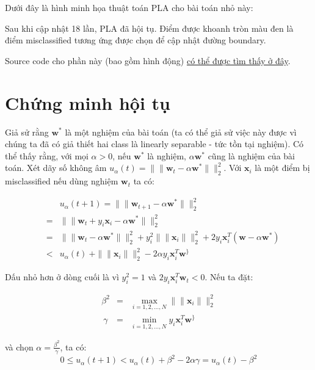 Dưới đây là hình minh họa thuật toán PLA cho bài toán nhỏ này: 
 
Sau khi cập nhật 18 lần, PLA đã hội tụ. Điểm được khoanh tròn màu đen là điểm misclassified tương ứng được chọn để cập nhật đường boundary.  
 
Source code cho phần này (bao gồm hình động) \href{https://github.com/tiepvupsu/tiepvupsu.github.io/blob/master/assets/pla/perceptron.py}{có thể được tìm thấy ở đây}. 
 
 
\section{Chứng minh hội tụ}
 
Giả sử rằng $\mathbf{w}^*$ là một nghiệm của bài toán (ta có thể giả sử việc này được vì chúng ta đã có giả thiết hai class là linearly separable - tức tồn tại nghiệm). Có thể thấy rằng, với mọi $\alpha > 0$, nếu $\mathbf{w}^*$ là nghiệm, $\alpha\mathbf{w}^*$ cũng là nghiệm của bài toán. Xét dãy số không âm $ u_{\alpha}(t) = \|\|\mathbf{w}_{t} - \alpha\mathbf{w}^*\|\|_2^2$. Với $\mathbf{x}_i$ là một điểm bị misclassified nếu dùng nghiệm $\mathbf{w}_t$ ta có:  
 
 
 
 
\begin{eqnarray} 
&&u_{\alpha}(t+1) = \|\|\mathbf{w}_{t+1} - \alpha \mathbf{w}^*\|\|_2^2 \\\ 
&=& \|\|\mathbf{w}_{t} + y_i\mathbf{x}_i - \alpha\mathbf{w}^*\|\|_2^2 \\\ 
&=& \|\|\mathbf{w}_{t} -\alpha\mathbf{w}^*\|\|_2^2 + y_i^2\|\|\mathbf{x}_i\|\|_2^2 + 2y_i\mathbf{x}_i^T(\mathbf{w} - \alpha\mathbf{w}^*) \\\ 
&<& u_{\alpha}(t) \ + \|\|\mathbf{x}_i\|\|_2^2 - 2\alpha y_i\mathbf{x}_i^T \mathbf{w}^\} 
\end{eqnarray} 
 
 
Dấu nhỏ hơn ở dòng cuối là vì $y_i^2 = 1$ và $2y_i\mathbf{x}_i^T\mathbf{w}_{t} < 0$. Nếu ta đặt:  
 
\begin{eqnarray} 
\beta^2 &=& \max_{i=1, 2, \dots, N}\|\|\mathbf{x}_i\|\|_2^2 \\\ 
\gamma &=& \min_{i=1, 2, \dots, N} y_i\mathbf{x}_i^T\mathbf{w}^\} 
\end{eqnarray} 
 
và chọn $\alpha = \frac{\beta^2}{\gamma}$, ta có: 
\begin{equation*} 
0 \leq u_{\alpha}(t+1) < u_{\alpha}(t) + \beta^2 - 2\alpha\gamma = u_{\alpha}(t) - \beta^2 
\end{equation*} 
 
